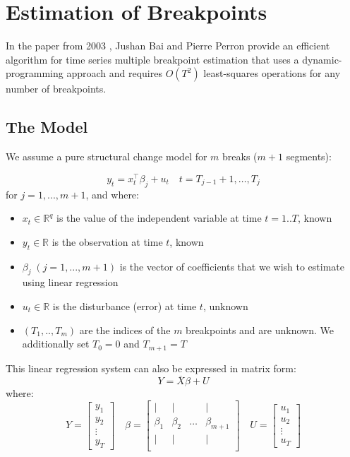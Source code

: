 \documentclass[main.tex]{subfiles}
\begin{document}
\chapter{Estimation of Breakpoints}
\label{chap:breakpoints}
In the paper from 2003 \cite{bai_perron}, Jushan Bai and Pierre Perron provide an
efficient algorithm for time series multiple breakpoint estimation that uses a
dynamic-programming approach and requires $O(T^2)$ least-squares operations for
any number of breakpoints.

\section{The Model}
\label{sec:breakpoints_the_model}
We assume a pure structural change model for $m$ breaks ($m+1$ segments):

\[
y_{t} = x_{t}^{\top} \beta_{j}+u_{t} \quad t=T_{j-1}+1, \ldots, T_{j}
\]
for $j = 1,...,m+1$, and where:
\begin{itemize}
\item $x_t \in \mathbb{R}^q$ is the value of the independent variable at time
  $t = 1..T$, known
\item $y_{t} \in \mathbb{R}$ is the observation at time $t$, known
\item $\beta_j \; (j=1,...,m+1)$ is the vector of coefficients that
  we wish to estimate using linear regression 
\item $u_{t} \in \mathbb{R}$ is the disturbance (error) at time $t$, unknown
\item $(T_1,..,T_m)$ are the indices of the $m$ breakpoints and are unknown.
 We additionally set $T_0 = 0$ and $T_{m+1} = T$
\end{itemize}
This linear regression system can also be expressed in matrix form:
\[
Y = \overline{X}\beta + U
\]
where:
\[
Y =
\begin{bmatrix}
y_1 \\
y_2 \\
\vdots \\
y_T
\end{bmatrix}
\quad
\beta =
\begin{bmatrix}
\vert & \vert &  & \vert \\
\beta_{1} & \beta_{2}  & \hdots & \beta_{m+1}\\
\vert & \vert &  & \vert\\
\end{bmatrix}
\quad
U =
\begin{bmatrix}
u_1 \\
u_2 \\
\vdots \\
u_T
\end{bmatrix}
\]
\end{document}
